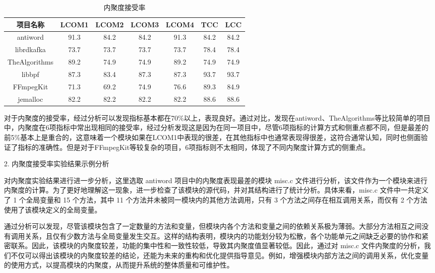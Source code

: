 \begin{table}[htbp]
\caption{内聚度接受率}
\vspace{0.5em}\centering\wuhao
\begin{tabular}{ccccccc}
\toprule
项目名称 & LCOM1 & LCOM2 & LCOM3 & LCOM4 & TCC & LCC \\
\midrule
antiword & 91.3 & 84.2 & 84.2 & 91.3 & 84.2 & 84.2 \\
librdkafka & 73.7 & 73.7 & 73.7 & 73.7 & 78.4 & 78.4 \\
TheAlgorithms & 89.2 & 74.9 & 74.9 & 89.2 & 74.9 & 74.9 \\
libbpf & 87.3 & 83.4 & 87.3 & 87.3 & 93.7 &  93.7 \\
FFmpegKit & 71.3 & 69.2 & 74.9 & 76.6 & 89.3 & 84.9 \\
jemalloc & 82.2 & 82.2 & 82.2 & 82.2 & 88.6 & 88.6 \\
\bottomrule
\end{tabular}
\end{table}
对于内聚度的接受率，经过分析可以发现指标基本都在70\%以上，表现良好。通过对比，发现在antiword、TheAlgorithms等比较简单的项目中，内聚度在6项指标中常出现相同的接受率，经过分析发现这是因为在同一项目中，尽管6项指标的计算方式和侧重点都不同，但是最差的前5\%基本上是重合的，这意味着一个模块如果在LCOM1中表现的很差，在其他指标中也通常表现得很差，这符合通常认知，同时也侧面验证了指标的准确性。但是对于FFmpegKit等较复杂的项目，6项指标则不太相同，体现了不同内聚度计算方式的侧重点。

2. 内聚度接受率实验结果示例分析

对内聚度实验结果进行进一步分析，这里选取 antiword 项目中的内聚度表现最差的模块 misc.c 文件进行分析，该文件作为一个模块来进行内聚度的计算。为了更好地理解这一现象，进一步检查了该模块的源代码，并对其结构进行了统计分析。具体来看，misc.c 文件中一共定义了 1 个全局变量和 15 个方法，其中 11 个方法并未被同一模块内的其他方法调用，只有 3 个方法之间存在相互调用关系，而仅有 2 个方法使用了该模块定义的全局变量。

通过分析可以发现，尽管该模块包含了一定数量的方法和变量，但模块内各个方法和变量之间的依赖关系极为薄弱。大部分方法相互之间没有调用关系，且仅有少数方法与全局变量发生交互。这样的结构表明，模块内的功能划分较为松散，各个功能单元之间缺乏必要的协作和紧密联系。因此，该模块的内聚度较差，功能的集中性和一致性较低，导致其内聚度值显著较低。因此，通过对 misc.c 文件内聚度的分析，我们不仅可以得出该模块的内聚度较差的结论，还能为未来的重构和优化提供指导意见。例如，增强模块内部方法之间的调用关系，优化变量的使用方式，以提高模块的内聚度，从而提升系统的整体质量和可维护性。

